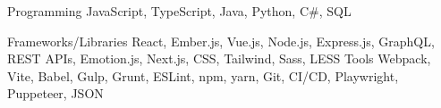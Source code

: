 

\begin{cvskills}

  \cvskill
    {Programming} %
    {JavaScript, TypeScript, Java, Python, C\#, SQL} %
    
  \cvskill
    {Frameworks/Libraries} %
    {React, Ember.js, Vue.js, Node.js, Express.js, GraphQL, REST APIs, Emotion.js, Next.js, CSS, Tailwind, Sass, LESS} %
  \cvskill
    {Tools} %
    {Webpack, Vite, Babel, Gulp, Grunt, ESLint, npm, yarn, Git, CI/CD, Playwright, Puppeteer, JSON} %



\end{cvskills}
